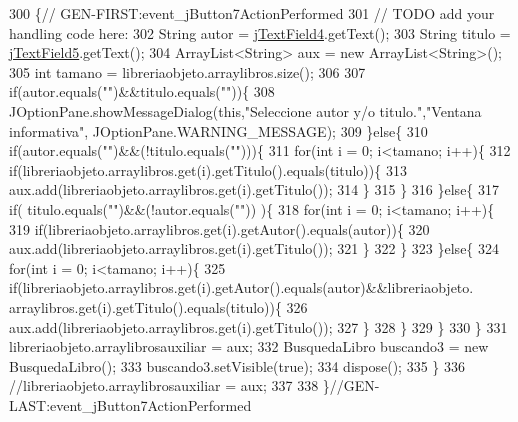 \begin{DoxyCode}
300                                                                          \{\textcolor{comment}{//
      GEN-FIRST:event\_jButton7ActionPerformed}
301         \textcolor{comment}{// TODO add your handling code here:}
302         String autor = \mbox{\hyperlink{class_interfaz_package_1_1_consulta_busqueda_a1955bd4179b98e109c23fb701af55b5d}{jTextField4}}.getText();
303         String titulo = \mbox{\hyperlink{class_interfaz_package_1_1_consulta_busqueda_a62b77207a9f1d648087f776c36b92c4a}{jTextField5}}.getText();
304         ArrayList<String> aux = \textcolor{keyword}{new} ArrayList<String>();
305         \textcolor{keywordtype}{int} tamano = libreriaobjeto.arraylibros.size();
306         
307         \textcolor{keywordflow}{if}(autor.equals(\textcolor{stringliteral}{""})&&titulo.equals(\textcolor{stringliteral}{""}))\{
308             JOptionPane.showMessageDialog(\textcolor{keyword}{this},\textcolor{stringliteral}{"Seleccione autor y/o titulo."},\textcolor{stringliteral}{"Ventana informativa"},
      JOptionPane.WARNING\_MESSAGE);
309         \}\textcolor{keywordflow}{else}\{
310             \textcolor{keywordflow}{if}(autor.equals(\textcolor{stringliteral}{""})&&(!titulo.equals(\textcolor{stringliteral}{""})))\{
311                 \textcolor{keywordflow}{for}(\textcolor{keywordtype}{int} i = 0; i<tamano; i++)\{
312                     \textcolor{keywordflow}{if}(libreriaobjeto.arraylibros.get(i).getTitulo().equals(titulo))\{
313                         aux.add(libreriaobjeto.arraylibros.get(i).getTitulo());
314                     \}
315                 \}
316             \}\textcolor{keywordflow}{else}\{
317                 \textcolor{keywordflow}{if}( titulo.equals(\textcolor{stringliteral}{""})&&(!autor.equals(\textcolor{stringliteral}{""})) )\{
318                     \textcolor{keywordflow}{for}(\textcolor{keywordtype}{int} i = 0; i<tamano; i++)\{
319                         \textcolor{keywordflow}{if}(libreriaobjeto.arraylibros.get(i).getAutor().equals(autor))\{
320                         aux.add(libreriaobjeto.arraylibros.get(i).getTitulo());
321                     \}
322                     \}
323                 \}\textcolor{keywordflow}{else}\{
324                     \textcolor{keywordflow}{for}(\textcolor{keywordtype}{int} i = 0; i<tamano; i++)\{
325                         \textcolor{keywordflow}{if}(libreriaobjeto.arraylibros.get(i).getAutor().equals(autor)&&libreriaobjeto.
      arraylibros.get(i).getTitulo().equals(titulo))\{
326                         aux.add(libreriaobjeto.arraylibros.get(i).getTitulo());
327                     \}
328                     \}
329                 \}
330             \}
331             libreriaobjeto.arraylibrosauxiliar = aux;
332             BusquedaLibro buscando3 = \textcolor{keyword}{new} BusquedaLibro();
333             buscando3.setVisible(\textcolor{keyword}{true});
334             dispose();
335         \}
336         \textcolor{comment}{//libreriaobjeto.arraylibrosauxiliar = aux;}
337         
338     \}\textcolor{comment}{//GEN-LAST:event\_jButton7ActionPerformed}
\end{DoxyCode}
